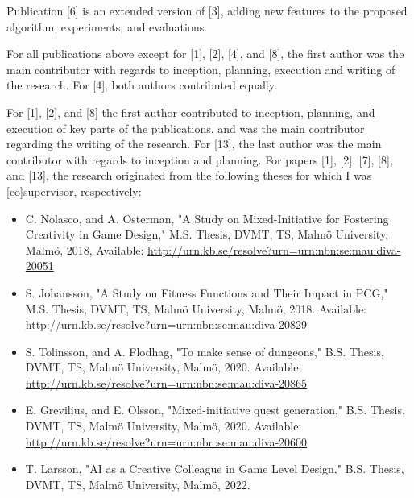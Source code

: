 \documentclass[hidelinks,green,onecolumn,twoside]{dissertation}
\begin{document}
{\selectfont

Publication [6] is an extended version of [3], adding new features to the proposed algorithm, experiments, and evaluations.

For all publications above except for [1], [2], [4], and [8], the first author was the main contributor with regards to inception, planning, execution and writing of the research. For [4], both authors contributed equally.

For [1], [2], and [8] the first author contributed to inception, planning, and execution of key parts of the publications, and was the main contributor regarding the writing of the research. For [13], the last author was the main contributor with regards to inception and planning. For papers [1], [2], [7], [8], and [13], the research originated from the following theses for which I was [co]supervisor, respectively:

\begin{itemize}
    \item C. Nolasco, and A. Österman, "A Study on Mixed-Initiative for Fostering Creativity in Game Design," M.S. Thesis, DVMT, TS, Malmö University, Malmö, 2018, Available: \url{http://urn.kb.se/resolve?urn=urn:nbn:se:mau:diva-20051}
    
    \item S. Johansson, "A Study on Fitness Functions and Their Impact in PCG," M.S. Thesis, DVMT, TS, Malmö University, Malmö, 2018. Available: \url{http://urn.kb.se/resolve?urn=urn:nbn:se:mau:diva-20829}
    
    \item S. Tolinsson, and A. Flodhag, "To make sense of dungeons," B.S. Thesis, DVMT, TS, Malmö University, Malmö, 2020. Available: \url{http://urn.kb.se/resolve?urn=urn:nbn:se:mau:diva-20865}
    
    \item E. Grevilius, and E. Olsson, "Mixed-initiative quest generation," B.S. Thesis, DVMT, TS, Malmö University, Malmö, 2020. Available: \url{http://urn.kb.se/resolve?urn=urn:nbn:se:mau:diva-20600}
    
    \item T. Larsson, "AI as a Creative Colleague in Game Level Design," B.S. Thesis, DVMT, TS, Malmö University, Malmö, 2022.
\end{itemize}
    
    
    
}
\end{document}
